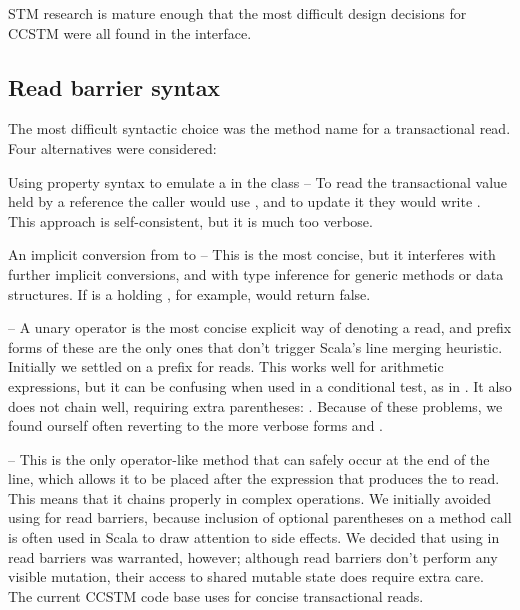 
STM research is mature enough that the most difficult design decisions
for CCSTM were all found in the interface.

\subsection{Read barrier syntax}
\label{sec:syntax}

The most difficult syntactic choice was the method name for a
transactional read.  Four alternatives were considered:

\begin{packed_enum}

\item Using property syntax to emulate a 
in the  class -- To read the transactional value held by a
reference  the caller would use , and to update it
they would write .  This approach is self-consistent,
but it is much too verbose.

\item An implicit conversion from  to  --
This is the most concise, but it interferes with further implicit
conversions, and with type inference for generic methods or data
structures.  If  is a  holding ,
for example,  would return false.

\item {} -- A unary operator is the most concise explicit
way of denoting a read, and prefix forms of these are the only ones
that don't trigger Scala's line merging heuristic.  Initially we
settled on a \code{!} prefix for reads.  This works well for arithmetic
expressions, but it can be confusing when used in a conditional test,
as in .  It also does not chain well, requiring
extra parentheses: .  Because of these problems, we
found ourself often reverting to the more verbose forms  and .

\item {} -- This is the only operator-like method that can
safely occur at the end of the line, which allows it to be placed after
the expression that produces the  to read.  This means that
it chains properly in complex operations.  We initially avoided using
 for read barriers, because inclusion of optional parentheses
on a method call is often used in Scala to draw attention to side effects.
We decided that using \code{()} in read barriers was warranted, however;
although read barriers don't perform any visible mutation, their access
to shared mutable state does require extra care.  The current CCSTM code
base uses  for concise transactional reads.

\end{packed_enum}

